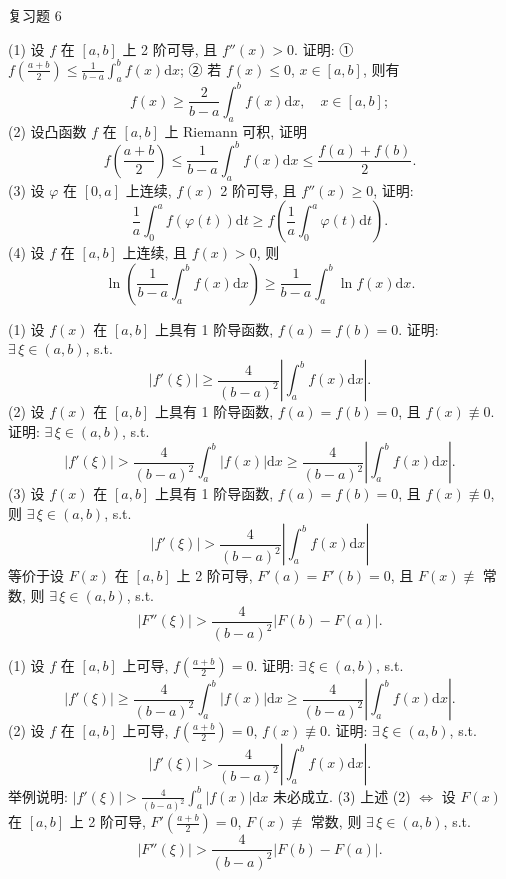 \begin{exblock}{复习题 6}

\item (1) 设 $f$ 在 $[a,b]$ 上 2 阶可导, 且 $f''(x)>0$. 证明:
① $f\left(\frac{a+b}{2}\right)\leqslant\frac{1}{b-a}\int_{a}^{b}f(x)\mathrm{d}x$;
② 若 $f(x)\leqslant 0$, $x\in[a,b]$, 则有
\[
f(x)\geqslant\frac{2}{b-a}\int_{a}^{b}f(x)\mathrm{d}x,\quad x\in[a,b];
\]
(2) 设凸函数 $f$ 在 $[a,b]$ 上 Riemann 可积, 证明
\[
f\left(\frac{a+b}{2}\right)\leqslant\frac{1}{b-a}\int_{a}^{b}f(x)\mathrm{d}x\leqslant\frac{f(a)+f(b)}{2}.
\]
(3) 设 $\varphi$ 在 $[0,a]$ 上连续, $f(x)$ 2 阶可导, 且 $f''(x)\geqslant 0$, 证明:
\[
\frac{1}{a}\int_{0}^{a}f(\varphi(t))\mathrm{d}t\geqslant f\left(\frac{1}{a}\int_{0}^{a}\varphi(t)\mathrm{d}t\right).
\]
(4) 设 $f$ 在 $[a,b]$ 上连续, 且 $f(x)>0$, 则
\[
\ln\left(\frac{1}{b-a}\int_{a}^{b}f(x)\mathrm{d}x\right)\geqslant\frac{1}{b-a}\int_{a}^{b}\ln f(x)\mathrm{d}x.
\]

\item (1) 设 $f(x)$ 在 $[a,b]$ 上具有 1 阶导函数, $f(a)=f(b)=0$. 证明: $\exists\,\xi\in(a,b)$, s.t.
\[
|f'(\xi)|\geqslant\frac{4}{(b-a)^{2}}\left|\int_{a}^{b}f(x)\mathrm{d}x\right|.
\]
(2) 设 $f(x)$ 在 $[a,b]$ 上具有 1 阶导函数, $f(a)=f(b)=0$, 且 $f(x)\not\equiv 0$. 证明: $\exists\,\xi\in(a,b)$, s.t.
\[
|f'(\xi)|>\frac{4}{(b-a)^{2}}\int_{a}^{b}|f(x)|\mathrm{d}x\geqslant\frac{4}{(b-a)^{2}}\left|\int_{a}^{b}f(x)\mathrm{d}x\right|.
\]
(3) 设 $f(x)$ 在 $[a,b]$ 上具有 1 阶导函数, $f(a)=f(b)=0$, 且 $f(x)\not\equiv 0$, 则 $\exists\,\xi\in(a,b)$, s.t.
\[
|f'(\xi)|>\frac{4}{(b-a)^{2}}\left|\int_{a}^{b}f(x)\mathrm{d}x\right|
\]
等价于设 $F(x)$ 在 $[a,b]$ 上 2 阶可导, $F'(a)=F'(b)=0$, 且 $F(x)\not\equiv$ 常数, 则 $\exists\,\xi\in(a,b)$, s.t.
\[
|F''(\xi)|>\frac{4}{(b-a)^{2}}|F(b)-F(a)|.
\]

\item (1) 设 $f$ 在 $[a,b]$ 上可导, $f\left(\frac{a+b}{2}\right)=0$. 证明: $\exists\,\xi\in(a,b)$, s.t.
\[
|f'(\xi)|\geqslant\frac{4}{(b-a)^{2}}\int_{a}^{b}|f(x)|\mathrm{d}x\geqslant\frac{4}{(b-a)^{2}}\left|\int_{a}^{b}f(x)\mathrm{d}x\right|.
\]
(2) 设 $f$ 在 $[a,b]$ 上可导, $f\left(\frac{a+b}{2}\right)=0$, $f(x)\not\equiv 0$. 证明: $\exists\,\xi\in(a,b)$, s.t.
\[
|f'(\xi)|>\frac{4}{(b-a)^{2}}\left|\int_{a}^{b}f(x)\mathrm{d}x\right|.
\]
举例说明: $|f'(\xi)|>\frac{4}{(b-a)^{2}}\int_{a}^{b}|f(x)|\mathrm{d}x$ 未必成立.
(3) 上述 (2) $\Leftrightarrow$ 设 $F(x)$ 在 $[a,b]$ 上 2 阶可导, $F'\left(\frac{a+b}{2}\right)=0$, $F(x)\not\equiv$ 常数, 则 $\exists\,\xi\in(a,b)$, s.t.
\[
|F''(\xi)|>\frac{4}{(b-a)^{2}}|F(b)-F(a)|.
\]


\end{exblock}
